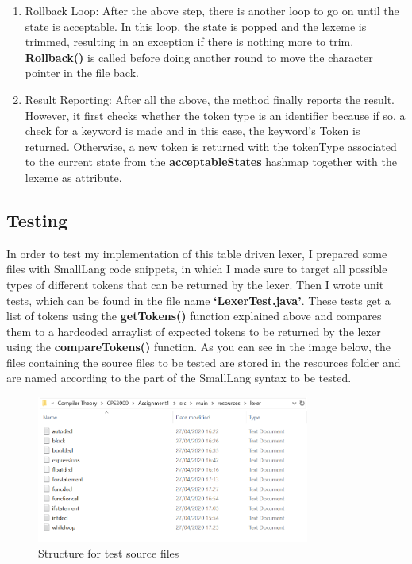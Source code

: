 \documentclass{article}
\begin{document}
\begin{enumerate}
\begin{enumerate}
						\item Rollback Loop: After the above step, there is another loop to go on until the state is acceptable. In this loop, the state is popped and the lexeme is trimmed, resulting in an exception if there is nothing more to trim. \textbf{Rollback()} is called before doing another round to move the character pointer in the file back.
						\item Result Reporting: After all the above, the method finally reports the result. However, it first checks whether the token type is an identifier because if so, a check for a keyword is made and in this case, the keyword's Token is returned. Otherwise, a new token is returned with the tokenType associated to the current state from the \textbf{acceptableStates} hashmap together with the lexeme as attribute.
			
						
						\end{enumerate}
					\end{enumerate}
					
					
					\subsection{Testing}
					
						In order to test my implementation of this table driven lexer, I prepared some files with SmallLang code snippets, in which I made sure to target all possible types of different tokens that can be returned by the lexer. Then I wrote unit tests, which can be found in the file name \textbf{`LexerTest.java'}. These tests get a list of tokens using the \textbf{getTokens()} function explained above and compares them to a hardcoded arraylist of expected tokens to be returned by the lexer using the \textbf{compareTokens()} function. As you can see in the image below, the files containing the source files to be tested are stored in the resources folder and are named according to the part of the SmallLang syntax to be tested.
			
					\begin{figure}[h!]
			 			\includegraphics[width=0.8\textwidth]{testfiles.png}
			 			\centering
			  			\caption{Structure for test source files}
			  			\label{fig:lexertestfiles}
					\end{figure}
					
\end{document}
